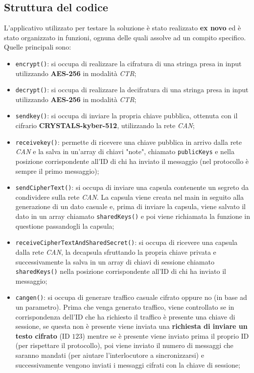 \subsection{Struttura del codice}
L'applicativo utilizzato per testare la soluzione è stato realizzato \textbf{ex novo} ed è stato organizzato in funzioni, ognuna delle quali assolve ad un compito specifico. Quelle principali sono:
\begin{itemize}
    \item \texttt{encrypt()}: si occupa di realizzare la cifratura di una stringa presa in input utilizzando \textbf{AES-256} in modalità \emph{CTR};
    \item \texttt{decrypt()}: si occupa di realizzare la decifratura di una stringa presa in input utilizzando \textbf{AES-256} in modalità \emph{CTR}; 
    \item \texttt{sendkey()}: si occupa di inviare la propria chiave pubblica, ottenuta con il cifrario \textbf{CRYSTALS-kyber-512}, utilizzando la rete \emph{CAN};
    \item \texttt{receivekey()}: permette di ricevere una chiave pubblica in arrivo dalla rete \emph{CAN} e la salva in un'array di chiavi "note", chiamato \texttt{publicKeys} e nella posizione corrispondente all'ID di chi ha inviato il messaggio (nel protocollo è sempre il primo messaggio);
    \item \texttt{sendCipherText()}: si occupa di inviare una capsula contenente un segreto da condividere sulla rete \emph{CAN}. La capsula viene creata nel main in seguito alla generazione di un dato casuale e, prima di inviare la capsula, viene salvato il dato in un array chiamato \texttt{sharedKeys()} e poi viene richiamata la funzione in questione passandogli la capsula;
    \item \texttt{receiveCipherTextAndSharedSecret()}: si occupa di ricevere una capsula dalla rete \emph{CAN}, la decapsula sfruttando la propria chiave privata e successivamente la salva in un array di chiavi di sessione chiamato \texttt{sharedKeys()} nella posizione corrispondente all'ID di chi ha inviato il messaggio;
    \item \texttt{cangen()}: si occupa di generare traffico casuale cifrato oppure no (in base ad un parametro). Prima che venga generato traffico, viene controllato se in corrispondenza dell'ID che ha richiesto il traffico è presente una chiave di sessione, se questa non è presente viene inviata una \textbf{richiesta di inviare un testo cifrato} (ID $123$) mentre se è presente viene inviato prima il proprio ID (per rispettare il protocollo), poi viene inviato il numero di messaggi che saranno mandati (per aiutare l'interlocutore a sincronizzarsi) e successivamente vengono inviati i messaggi cifrati con la chiave di sessione;

\end{itemize}
